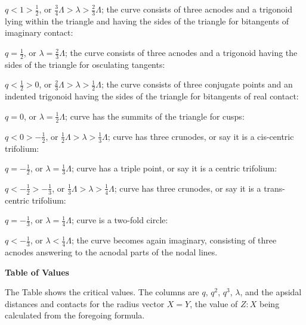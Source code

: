 \documentclass[12pt,a4paper]{article}
\theoremstyle{plain}
\theoremstyle{definition}
\begin{document}
$q < 1 > \tfrac{1}{2}$, or $\tfrac{3}{4}\Lambda > \lambda > \tfrac{2}{3}\Lambda$; the curve consists of three acnodes and a trigonoid lying within the triangle and having the sides of the triangle for bitangents of imaginary contact:

\smallskip

$q = \tfrac{1}{2}$, or $\lambda = \tfrac{2}{3}\Lambda$; the curve consists of three acnodes and a trigonoid having the sides of the triangle for osculating tangents:

\smallskip

$q < \tfrac{1}{2} > 0$, or $\tfrac{2}{3}\Lambda > \lambda > \tfrac{1}{2}\Lambda$; the curve consists of three conjugate points and an indented trigonoid having the sides of the triangle for bitangents of real contact:

\smallskip

$q = 0$, or $\lambda = \tfrac{1}{2}\Lambda$; curve has the summits of the triangle for cusps:

\smallskip

$q < 0 > -\tfrac{1}{2}$, or $\tfrac{1}{2}\Lambda > \lambda > \tfrac{1}{3}\Lambda$; curve has three crunodes, or say it is a cis-centric trifolium:

\smallskip

$q = -\tfrac{1}{2}$, or $\lambda = \tfrac{1}{3}\Lambda$; curve has a triple point, or say it is a centric trifolium:

\smallskip

$q < -\tfrac{1}{2} > -\tfrac{1}{3}$, or $\tfrac{1}{3}\Lambda > \lambda > \tfrac{1}{4}\Lambda$; curve has three crunodes, or say it is a trans-centric trifolium:

\smallskip

$q = -\tfrac{1}{3}$, or $\lambda = \tfrac{1}{4}\Lambda$; curve is a two-fold circle:

\smallskip

$q < -\tfrac{1}{3}$, or $\lambda < \tfrac{1}{4}\Lambda$; the curve becomes again imaginary, consisting of three acnodes answering to the acnodal parts of the nodal lines.

\vspace{12pt}

\begin{center}
\textbf{Table of Values}
\end{center}

The Table shows the critical values. The columns are $q$, $q^2$, $q^3$, $\lambda$, and the apsidal distances and contacts for the radius vector $X = Y$, the value of $Z : X$ being calculated from the foregoing formula.
\end{document}
